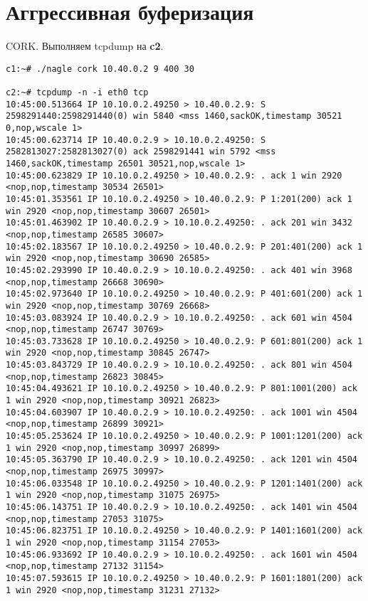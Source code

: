 \documentclass[a4paper,12pt]{article}
\begin{document}
\section{Аггрессивная буферизация}

CORK. Выполняем tcpdump на \textbf{c2}.

\begin{Verbatim}
c1:~# ./nagle cork 10.40.0.2 9 400 30

c2:~# tcpdump -n -i eth0 tcp
10:45:00.513664 IP 10.10.0.2.49250 > 10.40.0.2.9: S 2598291440:2598291440(0) win 5840 <mss 1460,sackOK,timestamp 30521 0,nop,wscale 1>
10:45:00.623714 IP 10.40.0.2.9 > 10.10.0.2.49250: S 2582813027:2582813027(0) ack 2598291441 win 5792 <mss 1460,sackOK,timestamp 26501 30521,nop,wscale 1>
10:45:00.623829 IP 10.10.0.2.49250 > 10.40.0.2.9: . ack 1 win 2920 <nop,nop,timestamp 30534 26501>
10:45:01.353561 IP 10.10.0.2.49250 > 10.40.0.2.9: P 1:201(200) ack 1 win 2920 <nop,nop,timestamp 30607 26501>
10:45:01.463902 IP 10.40.0.2.9 > 10.10.0.2.49250: . ack 201 win 3432 <nop,nop,timestamp 26585 30607>
10:45:02.183567 IP 10.10.0.2.49250 > 10.40.0.2.9: P 201:401(200) ack 1 win 2920 <nop,nop,timestamp 30690 26585>
10:45:02.293990 IP 10.40.0.2.9 > 10.10.0.2.49250: . ack 401 win 3968 <nop,nop,timestamp 26668 30690>
10:45:02.973640 IP 10.10.0.2.49250 > 10.40.0.2.9: P 401:601(200) ack 1 win 2920 <nop,nop,timestamp 30769 26668>
10:45:03.083924 IP 10.40.0.2.9 > 10.10.0.2.49250: . ack 601 win 4504 <nop,nop,timestamp 26747 30769>
10:45:03.733628 IP 10.10.0.2.49250 > 10.40.0.2.9: P 601:801(200) ack 1 win 2920 <nop,nop,timestamp 30845 26747>
10:45:03.843729 IP 10.40.0.2.9 > 10.10.0.2.49250: . ack 801 win 4504 <nop,nop,timestamp 26823 30845>
10:45:04.493621 IP 10.10.0.2.49250 > 10.40.0.2.9: P 801:1001(200) ack 1 win 2920 <nop,nop,timestamp 30921 26823>
10:45:04.603907 IP 10.40.0.2.9 > 10.10.0.2.49250: . ack 1001 win 4504 <nop,nop,timestamp 26899 30921>
10:45:05.253624 IP 10.10.0.2.49250 > 10.40.0.2.9: P 1001:1201(200) ack 1 win 2920 <nop,nop,timestamp 30997 26899>
10:45:05.363790 IP 10.40.0.2.9 > 10.10.0.2.49250: . ack 1201 win 4504 <nop,nop,timestamp 26975 30997>
10:45:06.033548 IP 10.10.0.2.49250 > 10.40.0.2.9: P 1201:1401(200) ack 1 win 2920 <nop,nop,timestamp 31075 26975>
10:45:06.143751 IP 10.40.0.2.9 > 10.10.0.2.49250: . ack 1401 win 4504 <nop,nop,timestamp 27053 31075>
10:45:06.823751 IP 10.10.0.2.49250 > 10.40.0.2.9: P 1401:1601(200) ack 1 win 2920 <nop,nop,timestamp 31154 27053>
10:45:06.933692 IP 10.40.0.2.9 > 10.10.0.2.49250: . ack 1601 win 4504 <nop,nop,timestamp 27132 31154>
10:45:07.593615 IP 10.10.0.2.49250 > 10.40.0.2.9: P 1601:1801(200) ack 1 win 2920 <nop,nop,timestamp 31231 27132>

\end{Verbatim}
\end{document}
